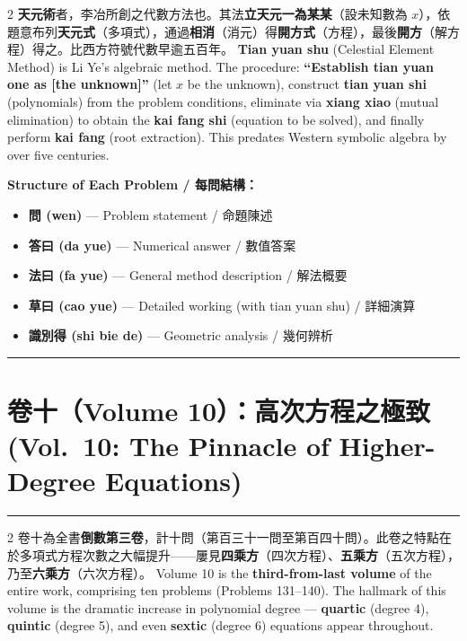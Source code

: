\documentclass[11pt,a4paper]{article}
\newcommand{\longline}{\noindent\rule{\textwidth}{0.4pt}}
\newcommand{\bcn}{\begin{paracol}{2}}
\newcommand{\ecn}{\end{paracol}}
\newcommand{\sw}{\switchcolumn}
\newcommand{\bilingualsection}[2]{\section*{#1\quad(#2)}}
\begin{document}
\vspace{0.3cm}

\bcn
\textbf{天元術}者，李冶所創之代數方法也。其法\textbf{立天元一為某某}（設未知數為 $x$），依題意布列\textbf{天元式}（多項式），通過\textbf{相消}（消元）得\textbf{開方式}（方程），最後\textbf{開方}（解方程）得之。比西方符號代數早逾五百年。
\sw
\textbf{Tian yuan shu} (Celestial Element Method) is Li Ye's algebraic method. The procedure: \textbf{``Establish tian yuan one as [the unknown]''} (let $x$ be the unknown), construct \textbf{tian yuan shi} (polynomials) from the problem conditions, eliminate via \textbf{xiang xiao} (mutual elimination) to obtain the \textbf{kai fang shi} (equation to be solved), and finally perform \textbf{kai fang} (root extraction). This predates Western symbolic algebra by over five centuries.
\ecn

\vspace{0.5cm}

\textbf{Structure of Each Problem / 每問結構：}
\begin{itemize}[leftmargin=2em]
  \item \textbf{問 (wen)} --- Problem statement / 命題陳述
  \item \textbf{答曰 (da yue)} --- Numerical answer / 數值答案
  \item \textbf{法曰 (fa yue)} --- General method description / 解法概要
  \item \textbf{草曰 (cao yue)} --- Detailed working (with tian yuan shu) / 詳細演算
  \item \textbf{識別得 (shi bie de)} --- Geometric analysis / 幾何辨析
\end{itemize}

\vspace{0.5cm}
\begin{center}
\longline
\end{center}

\newpage

\bilingualsection{卷十（Volume 10）：高次方程之極致}{Vol.\ 10: The Pinnacle of Higher-Degree Equations}

\longline

\begin{paracol}{2}
卷十為全書\textbf{倒數第三卷}，計十問（第百三十一問至第百四十問）。此卷之特點在於多項式方程次數之大幅提升——屢見\textbf{四乘方}（四次方程）、\textbf{五乘方}（五次方程），乃至\textbf{六乘方}（六次方程）。
\switchcolumn
Volume 10 is the \textbf{third-from-last volume} of the entire work, comprising ten problems (Problems 131--140). The hallmark of this volume is the dramatic increase in polynomial degree --- \textbf{quartic} (degree 4), \textbf{quintic} (degree 5), and even \textbf{sextic} (degree 6) equations appear throughout.
\end{paracol}
\end{document}
